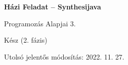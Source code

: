 
\begin{titlepage}
    \begin{center}
        \vspace*{1cm}
            
        \Huge
        \textbf{Házi Feladat – Synthesijava}
            
        \vspace{0.5cm}
        \LARGE
        Programozás Alapjai 3.
            
        \vspace{2.5cm}
            
            
        \vfill
            
        Kész (2. fázis)
            
        \vspace{0.8cm}
            
            
        \Large
        Utolsó jelentős módosítás: 2022. 11. 27.
        \vspace*{1cm}
            
    \end{center}
\end{titlepage}
